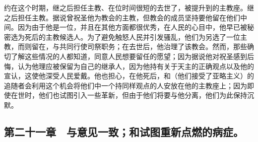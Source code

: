 约在这个时期，继之后担任主教、在位时间很短的去世了，被提升到的主教座。继之后担任主教。据说曾祝圣他为教会的主教，但教会的成员坚持要他留在他们中间。因为由于他是一位，并且在其他方面都很优秀，在人民的心目中，他早已被秘密选为死后的主教候选人。为了避免触怒人民并引发骚乱，他们为另选了一位主教，而则留在，与共同行使司祭职务；在去世后，他治理了该教会。然而，那些确切了解这些情况的人都知道，同意人民想要留任的愿望；因为据说他对祝圣感到后悔，认为他理应被保留为自己的继承人，因为他持有关于天主的正确观点以及他的宣认，这使他深受人民爱戴。他也担心，在他死后，和（他们接受了亚略主义）的追随者会利用这个机会将他们中一个持同样观点的人安放在他的主教座上；因为即使在世时，他们也试图引入一些革新，但由于他们将要与他分离，他们为此保持沉默。\par


\subsection{第二十一章　与意见一致；和试图重新点燃的病症。}


